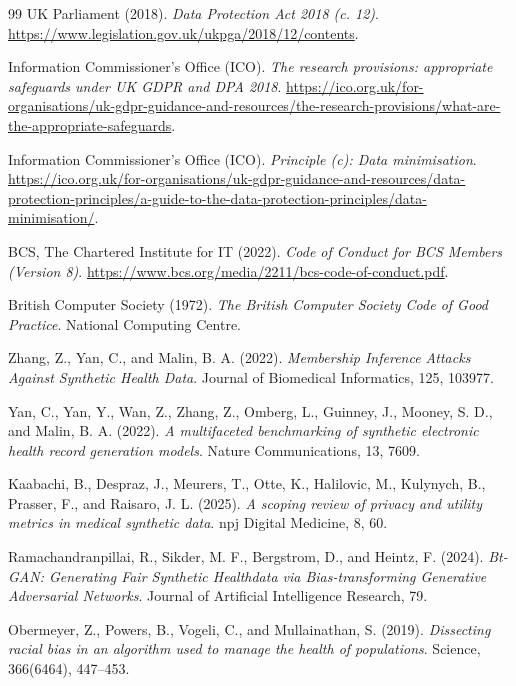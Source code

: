 \documentclass[11pt]{informatics-report}
\begin{document}
\begin{thebibliography}{99}
UK Parliament (2018).
\textit{Data Protection Act 2018 (c. 12)}.
\url{https://www.legislation.gov.uk/ukpga/2018/12/contents}.

Information Commissioner's Office (ICO).
\textit{The research provisions: appropriate safeguards under UK GDPR and DPA 2018}.
\url{https://ico.org.uk/for-organisations/uk-gdpr-guidance-and-resources/the-research-provisions/what-are-the-appropriate-safeguards}.

Information Commissioner's Office (ICO).
\textit{Principle (c): Data minimisation}.
\url{https://ico.org.uk/for-organisations/uk-gdpr-guidance-and-resources/data-protection-principles/a-guide-to-the-data-protection-principles/data-minimisation/}.

BCS, The Chartered Institute for IT (2022).
\textit{Code of Conduct for BCS Members (Version 8)}.
\url{https://www.bcs.org/media/2211/bcs-code-of-conduct.pdf}.

British Computer Society (1972).
\textit{The British Computer Society Code of Good Practice}.
National Computing Centre.

Zhang, Z., Yan, C., and Malin, B. A. (2022).
\textit{Membership Inference Attacks Against Synthetic Health Data}.
Journal of Biomedical Informatics, 125, 103977.

Yan, C., Yan, Y., Wan, Z., Zhang, Z., Omberg, L., Guinney, J., Mooney, S. D., and Malin, B. A. (2022).
\textit{A multifaceted benchmarking of synthetic electronic health record generation models}.
Nature Communications, 13, 7609.

Kaabachi, B., Despraz, J., Meurers, T., Otte, K., Halilovic, M., Kulynych, B., Prasser, F., and Raisaro, J. L. (2025).
\textit{A scoping review of privacy and utility metrics in medical synthetic data}.
npj Digital Medicine, 8, 60.

Ramachandranpillai, R., Sikder, M. F., Bergstrom, D., and Heintz, F. (2024).
\textit{Bt-GAN: Generating Fair Synthetic Healthdata via Bias-transforming Generative Adversarial Networks}.
Journal of Artificial Intelligence Research, 79.

Obermeyer, Z., Powers, B., Vogeli, C., and Mullainathan, S. (2019).
\textit{Dissecting racial bias in an algorithm used to manage the health of populations}.
Science, 366(6464), 447--453.


\end{thebibliography}
\end{document}
